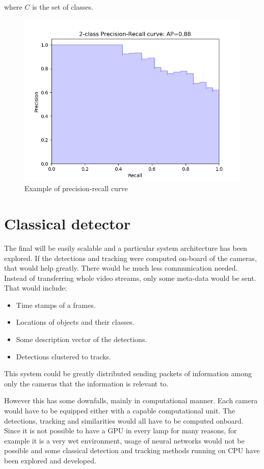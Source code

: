 \documentclass[a4paper,12pt,titlepage, twoside]{article}
\numberwithin{figure}{section}
\begin{document}
where $C$ is the set of classes.

\begin{figure}[H]
\centering
\includegraphics[width=1\linewidth]{fig/precision-recall.png}
\caption{Example of precision-recall curve}
\label{fig:precision-recall}
\end{figure}




\section{Classical detector}
The final will be easily scalable and a particular system architecture has been explored. If the detections and tracking were computed on-board of the cameras, that would help greatly. There would be much less communication needed. Instead of transferring whole video streams, only some meta-data would be sent. That would include: 

\begin{itemize}
\item Time stamps of a frames.
\item Locations of objects and their classes.
\item Some description vector of the detections.
\item Detections clustered to tracks.
\end{itemize}

This system could be greatly distributed sending packets of information among only the cameras that the information is relevant to.

However this has some downfalls, mainly in computational manner. Each camera would have to be equipped either with a capable computational unit. The detections, tracking and similarities would all have to be computed onboard. Since it is not possible to have a GPU in every lamp for many reasons, for example it is a very wet environment, usage of neural networks would not be possible and some classical detection and tracking methods running on CPU have been explored and developed.
\end{document}
